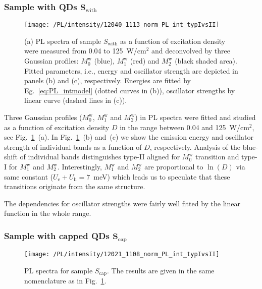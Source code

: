 \subsubsection*{Sample with QDs $\mathbf{S_\mathrm{with}}$}
\begin{figure}
	\centering
	\texttt{[image: /PL/intensity/12040\_1113\_norm\_PL\_int\_typIvsII]}
	\caption{(a) PL spectra of sample $S_\mathrm{with}$ as a function of excitation density were measured from 0.04 to 125~W/cm$^2$ and deconvolved by three Gaussian profiles: $M_0^\mathrm{w}$ (blue), $M_1^\mathrm{w}$ (red) and $M_2^\mathrm{w}$ (black shaded area). Fitted parameters, i.e., energy and oscillator strength are depicted in panels (b) and (c), respectively. Energies are fitted by Eg.~\ref{eq:PL_intmodel} (dotted curves in (b)), oscillator strengths by linear curve (dashed lines in (c)).}
	\label{fig:QD_w_int}
\end{figure}

Three Gaussian profiles ($M_0^\mathrm{w}$, $M_1^\mathrm{w}$ and $M_2^\mathrm{w}$) in PL spectra were fitted and studied as a function of excitation density $D$ in the range between 0.04 and 125~W/cm$^2$, see Fig.~\ref{fig:QD_w_int}~(a). In Fig.~\ref{fig:QD_w_int}~(b) and~(c) we show the emission energy and oscillator strength of individual bands as a function of $D$, respectively. Analysis of the blue-shift of individual bands distinguishes type-II aligned for $M_0^\mathrm{w}$ transition and type-I for $M_1^\mathrm{w}$ and $M_2^\mathrm{w}$. Interestingly, $M_1^\mathrm{w}$ and $M_2^\mathrm{w}$ are proportional to $\ln(D)$ via same constant ($U_\mathrm{e}+U_\mathrm{h}=7$~meV) which leads us to speculate that these transitions originate from the same structure. 

The dependencies for oscillator strengths were fairly well fitted by the linear function in the whole range.




\subsubsection*{Sample with capped QDs $\mathbf{S_\mathrm{cap}}$}
\begin{figure}
	\centering
	\texttt{[image: /PL/intensity/12021\_1108\_norm\_PL\_int\_typIvsII]}
	\caption{PL spectra for sample $S_\mathrm{cap}$. The results are given in the same nomenclature as in Fig.~\ref{fig:QD_w_int}.}
	\label{fig:QD_cap_int}
\end{figure}


